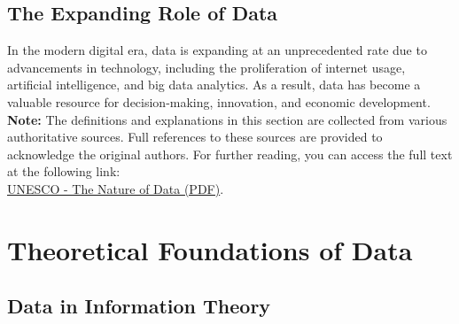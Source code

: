 \documentclass[12pt, oneside]{book}
\begin{document}
\subsection{The Expanding Role of Data}
In the modern digital era, data is expanding at an unprecedented rate due to advancements in technology, including the proliferation of internet usage, artificial intelligence, and big data analytics. As a result, data has become a valuable resource for decision-making, innovation, and economic development.
\vspace{0.5cm}\\
\textbf{Note:} The definitions and explanations in this section are collected from various authoritative sources. Full references to these sources are provided to acknowledge the original authors. For further reading, you can access the full text at the following link: \\
 \href{https://egyankosh.ac.in/bitstream/123456789/10935/3/Unit-2.pdf}{UNESCO - The Nature of Data (PDF)}.

\section{Theoretical Foundations of Data}

\subsection{Data in Information Theory}
\end{document}
